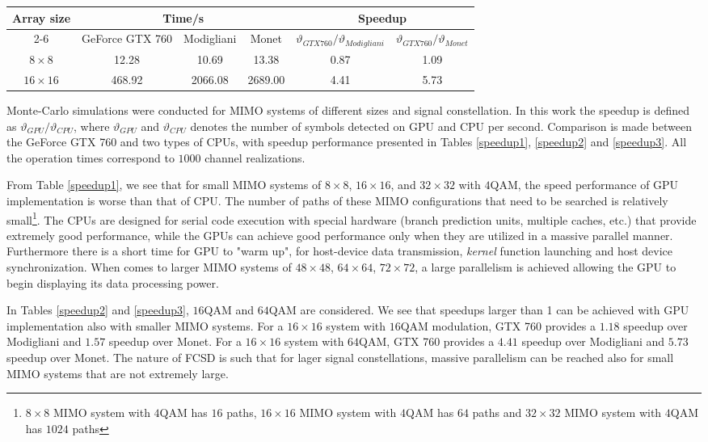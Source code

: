 \documentclass[letterpaper, 10pt, conference]{ieeeconf}
\begin{document}
\begin{table*}[htb]
\centering
\caption{Speedup Performance of Different MIMO Systems using 64 QAM}
\begin{tabular}{|c|c|c|c|c|c|}
\hline
\multirow{2}{*}{ Array size} & \multicolumn{3}{|c|}{Time/s} & \multicolumn{2}{|c|}{Speedup}\\
\cline{2-6}
&GeForce GTX 760 & Modigliani & Monet &  $\vartheta_{GTX 760}/\vartheta_{Modigliani}$  &  $\vartheta_{GTX 760}/\vartheta_{Monet}$ \\
\hline
$8\times 8$&12.28& 10.69&13.38 & 0.87&1.09 \\
\hline
$16\times 16$&468.92 & 2066.08&2689.00& 4.41& 5.73\\
\hline
\end{tabular}
\label{speedup3}
\end{table*}
Monte-Carlo simulations were conducted for MIMO systems of different sizes and signal constellation. In this work the speedup is defined as $\vartheta_{GPU}/\vartheta_{CPU}$, where $\vartheta_{GPU}$ and $\vartheta_{CPU}$ denotes the number of symbols detected on GPU and CPU per second. Comparison is made between the GeForce GTX 760 and two types of CPUs, with speedup performance presented in Tables \ref{speedup1}, \ref{speedup2} and \ref{speedup3}. All the operation times correspond to $1000$ channel realizations.

From Table \ref{speedup1}, we see that for small MIMO systems of $8\times 8$, $16\times 16$, and $32\times 32$ with $4$QAM, the speed performance of GPU implementation is worse than that of CPU. The number of paths of these MIMO configurations that need to be searched is relatively small\footnote{$8\times 8$ MIMO system with $4$QAM has $16$ paths, $16\times 16$ MIMO system with $4$QAM has $64$ paths and $32\times 32$ MIMO system with $4$QAM has $1024$ paths}. The CPUs are designed for serial code execution with special hardware (branch prediction units, multiple caches, etc.) that provide extremely good performance, while the GPUs can achieve good performance only when they are utilized in a massive parallel manner. Furthermore there is a short time for GPU to "warm up", for host-device data transmission, \textit{kernel} function  launching and host device synchronization. When comes to larger MIMO systems of $48\times 48$, $64\times 64$, $72\times 72$, a large parallelism is achieved allowing the GPU to begin displaying its data processing power. 

In Tables \ref{speedup2} and \ref{speedup3}, $16$QAM and $64$QAM are considered. We see that speedups larger than 1 can be achieved with GPU implementation also with smaller MIMO systems. For a $16\times 16$ system with $16$QAM modulation, GTX 760 provides a $1.18$ speedup over Modigliani and $1.57$ speedup over Monet. For a $16\times 16$ system with $64$QAM, GTX 760 provides a $4.41$ speedup over Modigliani and $5.73$ speedup over Monet. The nature of FCSD is such that for lager signal constellations, massive parallelism can be reached also for small MIMO systems that are not extremely large.
\end{document}
